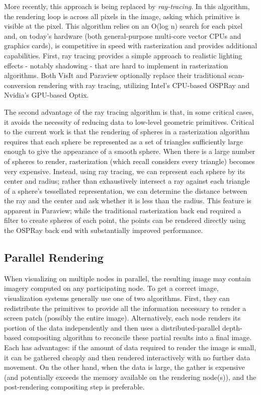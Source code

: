 \documentclass[journal]{IEEEtran}
\begin{document}
More recently, this approach is being replaced by \textit{ray-tracing}.  In this algorithm, the rendering loop is across all pixels in the image, asking which primitive is visible at the pixel.  This algorithm relies on an O(log n) search for each pixel and, on today's hardware (both general-purpose multi-core vector CPUs and graphics cards), is competitive in speed with rasterization and provides additional capabilities.  First, ray tracing provides a simple approach to realistic lighting effects - notably shadowing - that are hard to implement in rasterization algorithms.  Both VisIt and Paraview optionally replace their traditional scan-conversion rendering with ray tracing, utilizing Intel's CPU-based OSPRay and Nvidia's GPU-based Optix.  

The second advantage of the ray tracing algorithm is that, in some critical cases, it avoids the necessity of reducing data to low-level geometric primitives.  Critical to the current work is that the rendering of spheres in a rasterization algorithm requires that each sphere be represented as a set of triangles sufficiently large enough to give the appearance of a smooth sphere.   When there is a large number of spheres to render, rasterization (which recall considers every triangle) becomes very expensive.  Instead, using ray tracing, we can represent each sphere by its center and radius; rather than exhaustively intersect a ray against each triangle of a sphere's tessellated representation, we can determine the distance between the ray and the center and ask whether it is less than the radius.  This feature is apparent in Paraview; while the traditional rasterization back end required a filter to create spheres of each point, the points can be rendered directly using the OSPRay back end with substantially improved performance.

\subsection{Parallel Rendering}
When visualizing on multiple nodes in parallel, the resulting image may contain imagery computed on any participating node. To get a correct image, visualization systems generally use one of two algorithms. First, they can redistribute the primitives to provide all the information necessary to render a screen patch (possibly the entire image).  Alternatively, each node renders its portion of the data independently and then uses a distributed-parallel depth-based compositing algorithm to reconcile these partial results into a final image. Each has advantages: if the amount of data required to render the image is small, it can be gathered cheaply and then rendered interactively with no further data movement.  On the other hand, when the data is large, the gather is expensive (and potentially exceeds the memory available on the rendering node(s)), and the post-rendering compositing step is preferable.
\end{document}

